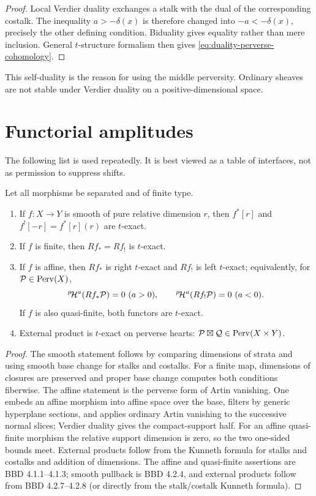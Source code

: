 \begin{proof}
Local Verdier duality exchanges a stalk with the dual of the corresponding
costalk.  The inequality \(a>-\delta(x)\) is therefore changed into
\(-a<-\delta(x)\), precisely the other defining condition.  Biduality gives
equality rather than mere inclusion.  General \(t\)-structure formalism then
gives \eqref{eq:duality-perverse-cohomology}.
\end{proof}

This self-duality is the reason for using the middle perversity.  Ordinary
sheaves are not stable under Verdier duality on a positive-dimensional space.

\section{Functorial amplitudes}

The following list is used repeatedly.  It is best viewed as a table of
interfaces, not as permission to suppress shifts.

\begin{proposition}
\label{prop:basic-perverse-exactness}
Let all morphisms be separated and of finite type.
\begin{enumerate}
\item If \(f:X\to Y\) is smooth of pure relative dimension \(r\), then
      \(f^*[r]\) and \(f^![-r]=f^*[r](r)\) are \(t\)-exact.
\item If \(f\) is finite, then \(Rf_*=Rf_!\) is \(t\)-exact.
\item If \(f\) is affine, then \(Rf_*\) is right \(t\)-exact and \(Rf_!\) is
      left \(t\)-exact; equivalently, for \(\mathcal P\in\operatorname{Perv}(X)\),
      \[
        {}^{p}\!\mathcal H^a(Rf_*\mathcal P)=0\ (a>0),\qquad
        {}^{p}\!\mathcal H^a(Rf_!\mathcal P)=0\ (a<0).
      \]
      If \(f\) is also quasi-finite, both functors are \(t\)-exact.
\item External product is \(t\)-exact on perverse hearts:
      \(\mathcal P\boxtimes\mathcal Q\in\operatorname{Perv}(X\times Y)\).
\end{enumerate}
\end{proposition}

\begin{proof}
The smooth statement follows by comparing dimensions of strata and using
smooth base change for stalks and costalks.  For a finite map, dimensions of
closures are preserved and proper base change computes both conditions
fiberwise.  The affine statement is the perverse form of Artin vanishing.  One
embeds an affine morphism into affine space over the base, filters by generic
hyperplane sections, and applies ordinary Artin vanishing to the successive
normal slices; Verdier duality gives the compact-support half.  For an affine
quasi-finite morphism the relative support dimension is zero, so the two
one-sided bounds meet.  External products follow from the Kunneth formula for
stalks and costalks and addition of dimensions.  The affine and quasi-finite
assertions are BBD 4.1.1--4.1.3; smooth pullback is BBD 4.2.4, and external
products follow from BBD 4.2.7--4.2.8 (or directly from the stalk/costalk
Kunneth formula).
\end{proof}


